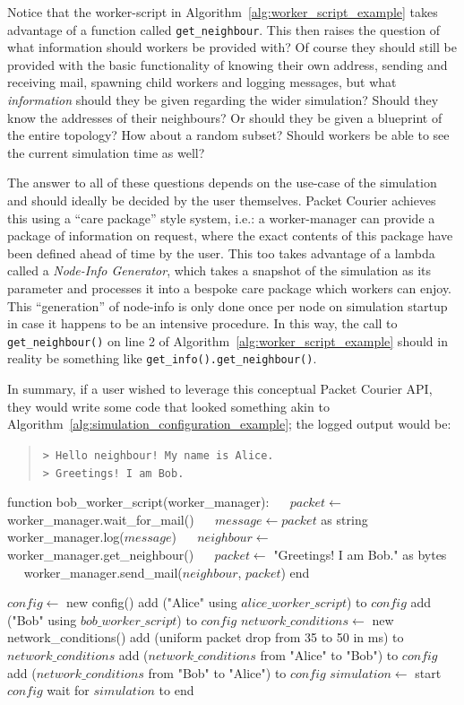Notice that the worker-script in Algorithm~\ref{alg:worker_script_example} takes advantage of a function called
\texttt{get\_neighbour}. This then raises the question of what information should workers be provided with? Of course
they should still be provided with the basic functionality of knowing their own address, sending and receiving mail,
spawning child workers and logging messages, but what \emph{information} should they be given regarding the wider
simulation? Should they know the addresses of their neighbours? Or should they be given a blueprint of the entire
topology? How about a random subset? Should workers be able to see the current simulation time as well?

The answer to all of these questions depends on the use-case of the simulation and should ideally be decided by the
user themselves. Packet Courier achieves this using a ``care package'' style system, i.e.: a worker-manager can
provide a package of information on request, where the exact contents of this package have been defined ahead of
time by the user. This too takes advantage of a lambda called a \emph{Node-Info Generator}, which takes a snapshot of
the simulation as its parameter and processes it into a bespoke care package which workers can enjoy. This
``generation'' of node-info is only done once per node on simulation startup in case it happens to be an
intensive procedure. In this way, the call to \texttt{get\_neighbour()} on line 2 of
Algorithm~\ref{alg:worker_script_example} should in reality be something like \texttt{get\_info().get\_neighbour()}.

In summary, if a user wished to leverage this conceptual Packet Courier API, they would write some code that looked
something akin to Algorithm~\ref{alg:simulation_configuration_example}; the logged output would be:
\begin{quote}
    \texttt{> Hello neighbour! My name is Alice.} \\
    \texttt{> Greetings! I am Bob.}
\end{quote}

\newpage

\begin{algorithm}[caption={An example of what configuring a simulation might look like.},
    label={alg:simulation_configuration_example},
    captionpos=b]
    function bob_worker_script(worker_manager):
    $\quad$ $packet \gets$ worker_manager.wait_for_mail()
    $\quad$ $message \gets packet$ as string
    $\quad$ worker_manager.log($message$)
    $\quad$ $neighbour \gets$ worker_manager.get_neighbour()
    $\quad$ $packet \gets$ "Greetings! I am Bob." as bytes
    $\quad$ worker_manager.send_mail($neighbour$, $packet$)
    end

    $config \gets$ new config()
    add ("Alice" using $alice\_worker\_script$) to $config$
    add ("Bob" using $bob\_worker\_script$) to $config$
    $network\_conditions \gets$ new network_conditions()
    add (uniform packet drop from 35 to 50 in ms) to $network\_conditions$
    add ($network\_conditions$ from "Alice" to "Bob") to $config$
    add ($network\_conditions$ from "Bob" to "Alice") to $config$
    $simulation \gets$ start $config$
    wait for $simulation$ to end
\end{algorithm}

